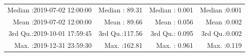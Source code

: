 \documentclass[
  10pt,
  a4paper,oneside]{article}
\begin{document}
\begin{longtable}[]{@{}rrrr@{}}
\begin{minipage}[t]{0.33\columnwidth}
Median :2019-07-02 12:00:00\strut
\end{minipage} & \begin{minipage}[t]{0.19\columnwidth}\raggedleft
Median : 89.31\strut
\end{minipage} & \begin{minipage}[t]{0.19\columnwidth}\raggedleft
Median : 0.001\strut
\end{minipage} & \begin{minipage}[t]{0.19\columnwidth}\raggedleft
Median :0.001\strut
\end{minipage}\tabularnewline
\begin{minipage}[t]{0.33\columnwidth}\raggedleft
Mean :2019-07-02 12:00:00\strut
\end{minipage} & \begin{minipage}[t]{0.19\columnwidth}\raggedleft
Mean : 89.66\strut
\end{minipage} & \begin{minipage}[t]{0.19\columnwidth}\raggedleft
Mean : 0.056\strut
\end{minipage} & \begin{minipage}[t]{0.19\columnwidth}\raggedleft
Mean :0.002\strut
\end{minipage}\tabularnewline
\begin{minipage}[t]{0.33\columnwidth}\raggedleft
3rd Qu.:2019-10-01 17:59:45\strut
\end{minipage} & \begin{minipage}[t]{0.19\columnwidth}\raggedleft
3rd Qu.:117.56\strut
\end{minipage} & \begin{minipage}[t]{0.19\columnwidth}\raggedleft
3rd Qu.: 0.095\strut
\end{minipage} & \begin{minipage}[t]{0.19\columnwidth}\raggedleft
3rd Qu.:0.002\strut
\end{minipage}\tabularnewline
\begin{minipage}[t]{0.33\columnwidth}\raggedleft
Max. :2019-12-31 23:59:30\strut
\end{minipage} & \begin{minipage}[t]{0.19\columnwidth}\raggedleft
Max. :162.81\strut
\end{minipage} & \begin{minipage}[t]{0.19\columnwidth}\raggedleft
Max. : 0.961\strut
\end{minipage} & \begin{minipage}[t]{0.19\columnwidth}\raggedleft
Max. :0.119\strut
\end{minipage}\tabularnewline

\end{longtable}
\end{document}
